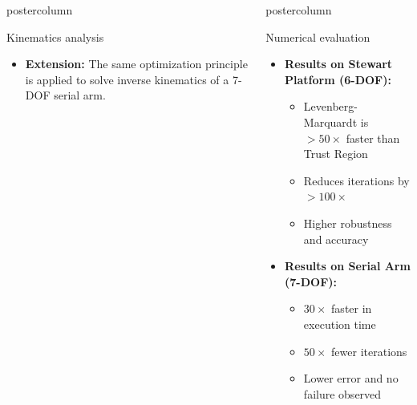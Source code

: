 \documentclass{beamer}
\newlength{\columnheight}
\begin{document}
\begin{frame}
\begin{columns}
\begin{column}{.43\textwidth}
\begin{beamercolorbox}[center]{postercolumn}
\begin{minipage}{.98\textwidth}
{\begin{myblock}{Kinematics analysis}
\begin{itemize}
							\item \textbf{Extension:} The same optimization principle is applied to solve inverse kinematics of a 7-DOF serial arm.
						\end{itemize}
					\end{myblock}\vfill
		}\end{minipage}\end{beamercolorbox}
	\end{column}
	\begin{column}{.57\textwidth}
		\begin{beamercolorbox}[center]{postercolumn}
			\begin{minipage}{.98\textwidth} %
				\parbox[t][\columnheight]{\textwidth}{ %
					\begin{myblock}{Numerical evaluation}
						
						\begin{itemize}
							\item \textbf{Results on Stewart Platform (6-DOF):}
							\begin{itemize}
								\item Levenberg-Marquardt is $>50\times$ faster than Trust Region
								\item Reduces iterations by $>100\times$
								\item Higher robustness and accuracy
							\end{itemize}
							
							\item \textbf{Results on Serial Arm (7-DOF):}
							\begin{itemize}
								\item $30\times$ faster in execution time
								\item $50\times$ fewer iterations
								\item Lower error and no failure observed
							\end{itemize}
						

\end{itemize}
\end{myblock}}
\end{minipage}
\end{beamercolorbox}
\end{column}
\end{columns}
\end{frame}
\end{document}

